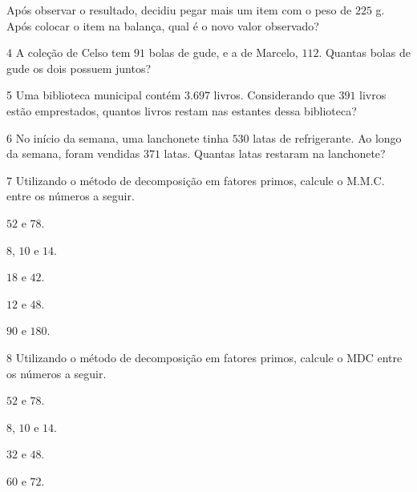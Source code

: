 Após observar o resultado, decidiu pegar mais um item com o peso de
$225$ g. Após colocar o item na balança, qual é o novo valor observado?


\num{4}  A coleção de Celso tem $91$ bolas de gude, e a de Marcelo, $112$. Quantas
bolas de gude os dois possuem juntos?


\num{5}  Uma biblioteca municipal contém $3.697$ livros. Considerando que $391$
livros estão emprestados, quantos livros restam nas estantes dessa
biblioteca?


\num{6}  No início da semana, uma lanchonete tinha $530$ latas de refrigerante.
Ao longo da semana, foram vendidas $371$ latas. Quantas latas restaram na
lanchonete?


\num{7}  Utilizando o método de decomposição em fatores primos, calcule o M.M.C. entre os números a seguir.

\begin{escolha}
\item $52$ e $78$.

\item $8$, $10$ e $14$.

\item $18$ e $42$.

\item $12$ e $48$.

\item $90$ e $180$.

\end{escolha}

\num{8}  Utilizando o método de decomposição em fatores primos, calcule o MDC entre os números a seguir.

\begin{escolha}
\item $52$ e $78$.

\item $8$, $10$ e $14$.

\item $32$ e $48$.

\item $60$ e $72$.

\end{escolha}

